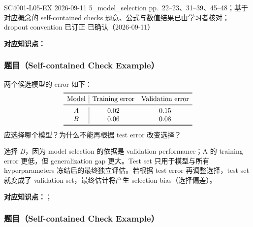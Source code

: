 

\examplemeta
  {SC4001-L05-EX}
  {2026-09-11}
  {5\_model\_selection pp.~22--23、31--39、45--48；基于对应概念的 self-contained checks}
  {题意、公式与数值结果已由学习者核对；dropout convention 已订正}
  {已确认（2026-09-11）}


\textbf{对应知识点：}

\subsubsection*{题目（Self-contained Check Example）}

两个候选模型的 error 如下：
\[
  \begin{array}{c|cc}
    \toprule
    \text{Model} & \text{Training error} & \text{Validation error}\\
    \midrule
    A & 0.02 & 0.15\\
    B & 0.06 & 0.08\\
    \bottomrule
  \end{array}
\]
应选择哪个模型？为什么不能再根据 test error 改变选择？

\begin{checkedsolution}
选择 $\boxed{B}$，因为 model selection 的依据是 validation performance；A 的 training error 更低，但 generalization gap 更大。Test set 只用于模型与所有 hyperparameters 冻结后的最终独立评估。若根据 test error 再调整选择，test set 就变成了 validation set，最终估计将产生 selection bias（选择偏差）。
\end{checkedsolution}


\textbf{对应知识点：}；

\subsubsection*{题目（Self-contained Check Example）}

